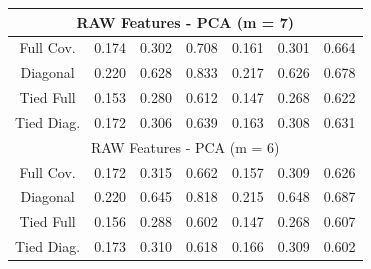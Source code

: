 \documentclass[12pt,a4paper]{article}
\begin{document}
\begin{center}
\begin{tabular}{c|ccc|ccc}
        \hline
        \multicolumn{7}{c}{RAW Features - PCA (m = 7)}                                                                                                                      \\
        \hline
        Full Cov.  & 0.174                          & 0.302                    & 0.708                & 0.161                & 0.301                & 0.664                 \\
        Diagonal   & 0.220                          & 0.628                    & 0.833                & 0.217                & 0.626                & 0.678                 \\
        Tied Full  & 0.153                          & 0.280                    & 0.612                & 0.147                & 0.268                & 0.622                 \\
        Tied Diag. & 0.172                          & 0.306                    & 0.639                & 0.163                & 0.308                & 0.631                 \\

        \hline
        \multicolumn{7}{c}{RAW Features - PCA (m = 6)}                                                                                                                      \\
        \hline
        Full Cov.  & 0.172                          & 0.315                    & 0.662                & 0.157                & 0.309                & 0.626                 \\
        Diagonal   & 0.220                          & 0.645                    & 0.818                & 0.215                & 0.648                & 0.687                 \\
        Tied Full  & 0.156                          & 0.288                    & 0.602                & 0.147                & 0.268                & 0.607                 \\
        Tied Diag. & 0.173                          & 0.310                    & 0.618                & 0.166                & 0.309                & 0.602                 \\


\end{tabular}
\end{center}
\end{document}
